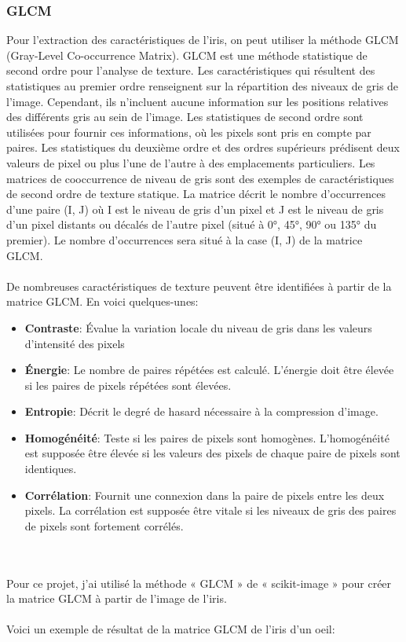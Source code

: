 \documentclass[12pt,twoside,letterpaper]{article}
\begin{document}
\subsubsection{GLCM}
Pour l’extraction des caractéristiques de l’iris, on peut utiliser la méthode GLCM (Gray-Level Co-occurrence Matrix). GLCM est une méthode statistique de second ordre pour l'analyse de texture. Les caractéristiques qui résultent des statistiques au premier ordre renseignent sur la répartition des niveaux de gris de l'image. Cependant, ils n'incluent aucune information sur les positions relatives des différents gris au sein de l'image. Les statistiques de second ordre sont utilisées pour fournir ces informations, où les pixels sont pris en compte par paires. Les statistiques du deuxième ordre et des ordres supérieurs prédisent deux valeurs de pixel ou plus l'une de l'autre à des emplacements particuliers. Les matrices de cooccurrence de niveau de gris sont des exemples de caractéristiques de second ordre de texture statique. La matrice décrit le nombre d’occurrences d’une paire (I, J) où I est le niveau de gris d’un pixel et J est le niveau de gris d’un pixel distants ou décalés de l’autre pixel (situé à 0°, 45°, 90° ou 135° du premier). Le nombre d’occurrences sera situé à la case (I, J) de la matrice GLCM.
\\~\\
De nombreuses caractéristiques de texture peuvent être identifiées à partir de la matrice GLCM. En voici quelques-unes:
\begin{itemize}
    \item \textbf{Contraste}: Évalue la variation locale du niveau de gris dans les valeurs d'intensité des pixels
    \item \textbf{Énergie}: Le nombre de paires répétées est calculé. L'énergie doit être élevée si les paires de pixels répétées sont élevées.
    \item \textbf{Entropie}: Décrit le degré de hasard nécessaire à la compression d'image.
    \item \textbf{Homogénéité}: Teste si les paires de pixels sont homogènes. L'homogénéité est supposée être élevée si les valeurs des pixels de chaque paire de pixels sont identiques.
    \item \textbf{Corrélation}: Fournit une connexion dans la paire de pixels entre les deux pixels. La corrélation est supposée être vitale si les niveaux de gris des paires de pixels sont fortement corrélés.
\end{itemize}
\cite{ref_02}
\\~\\
Pour ce projet, j'ai utilisé la méthode « GLCM » de « scikit-image » pour créer la matrice GLCM à partir de l'image de l'iris.
\\~\\
Voici un exemple de résultat de la matrice GLCM de l'iris d'un oeil:
\end{document}
